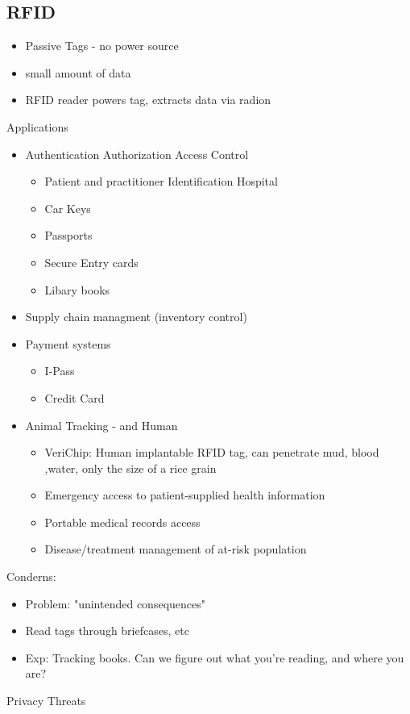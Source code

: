 \documentclass[a4paper, 12pt]{article}
\begin{document}
\subsection{RFID}
\begin{itemize}
\item Passive Tags - no power source
\item small amount of data
\item RFID reader powers tag, extracts data via radion
\end{itemize}
\large Applications
\begin{itemize}
\item Authentication Authorization Access Control
\begin{itemize}
\item Patient and practitioner Identification Hospital
\item Car Keys
\item Passports
\item Secure Entry cards
\item Libary books
\end{itemize}
\item Supply chain managment (inventory control)
\item Payment systems
\begin{itemize}
\item I-Pass
\item Credit Card
\end{itemize}
\item Animal Tracking - and Human 
\begin{itemize}
\item VeriChip: Human implantable RFID tag, can penetrate mud, blood ,water, only the size of a rice grain
\item Emergency access to patient-supplied health information
\item Portable medical records access
\item Disease/treatment management of at-risk population
\end{itemize}
\end{itemize}
\large Conderns:
\begin{itemize}
\item Problem: "unintended consequences"
\item Read tags through briefcases, etc
\item Exp: Tracking books. Can we figure out what you're reading, and where you are?
\end{itemize}
\large Privacy Threats
\end{document}
